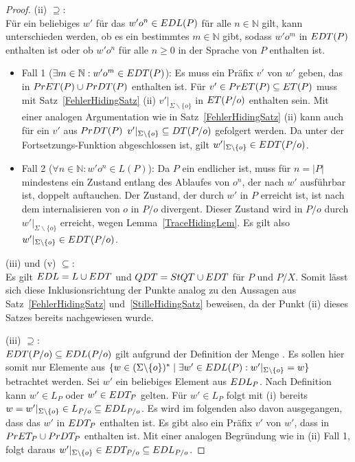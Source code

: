 \begin{proof}
  (ii)  \glqq $\supseteq$\grqq{}:\\
  Für ein beliebiges $w'$ für das $w'o^n\in EDL (P)$ für alle $n\in\mathbb{N}$
  gilt, kann unterschieden werden, ob es ein bestimmtes $m\in\mathbb{N}$ gibt,
  sodass $w'o^m$ in $EDT (P)$ enthalten ist oder ob $w'o^n$ für alle $n\geq 0$
  in der Sprache von $P$ enthalten ist.
  \begin{itemize}
    \item Fall 1 ($\exists m\in\mathbb{N}: w'o^m\in EDT (P)$): Es muss ein
      Präfix $v'$ von $w'$ geben, das in $PrET (P)\cup PrDT (P)$ enthalten
      ist. Für $v'\in PrET (P) \subseteq ET (P)$ muss mit
      Satz~\ref{FehlerHidingSatz} (ii) $v'|_{\Sigma\backslash\{o\}}$ in $ET
      (P/o)$ enthalten sein. Mit einer analogen Argumentation wie in
      Satz~\ref{FehlerHidingSatz} (ii) kann auch für ein $v'$ aus $PrDT (P)$
      $v'|_{\Sigma\backslash\{o\}}\subseteq DT (P/o)$ gefolgert werden. Da
      \EDT{} unter der Fortsetzungs-Funktion \cont{} abgeschlossen ist, gilt
      $w'|_{\Sigma\backslash\{o\}}\in EDT (P/o)$.
    \item Fall 2 ($\forall n\in\mathbb{N}: w'o^n\in L (P)$): Da $P$ ein
      endlicher \MEIO{} ist, muss für $n = |P|$ mindestens ein Zustand entlang
      des Ablaufes von $o^n$, der nach $w'$ ausführbar ist, doppelt auftauchen.
      Der Zustand, der durch $w'$ in $P$ erreicht ist, ist nach dem
      internalisieren von $o$ in $P/o$ divergent. Dieser Zustand wird in $P/o$
      durch $w'|_{\Sigma\backslash\{o\}}$ erreicht, wegen
      Lemma~\ref{TraceHidingLem}. Es gilt also $w'|_{\Sigma\backslash\{o\}} \in
      EDT (P/o)$.
  \end{itemize}

  (iii) und (v) \glqq $\subseteq$\grqq{}:\\
  Es gilt $EDL = L \cup EDT$ und $QDT = StQT \cup EDT$ für $P$ und $P/X$.
  Somit lässt sich diese Inklusionsrichtung der Punkte analog zu den Aussagen
  aus Satz~\ref{FehlerHidingSatz} und~\ref{StilleHidingSatz} beweisen, da der
  Punkt (ii) dieses Satzes bereits nachgewiesen wurde.

  (iii) \glqq $\supseteq$\grqq{}:\\
  $EDT (P/o)\subseteq EDL (P/o)$ gilt aufgrund der Definition der Menge
  \EDL{}. Es sollen hier somit nur Elemente aus $\{w\in (\Sigma\backslash
  \{o\})^*\mid \exists w'\in EDL(P): w'|_{\Sigma\backslash \{o\}} = w\}$
  betrachtet werden. Sei $w'$ ein beliebiges Element aus $EDL _P$. Nach
  Definition kann $w'\in L_P$ oder $w'\in EDT _P$ gelten. Für $w'\in L_P$ folgt
  mit (i) bereits $w = w'|_{\Sigma\backslash \{o\}}\in L_{P/o}\subseteq EDL
  _{P/o}$. Es wird im folgenden also davon ausgegangen, dass das $w'$ in $EDT
  _P$ enthalten ist. Es gibt also ein Präfix $v'$ von $w'$, dass in $PrET_P
  \cup PrDT _P$ enthalten ist. Mit einer analogen Begründung wie in (ii) Fall
  1, folgt daraus $w'|_{\Sigma\backslash\{o\}} \in EDT _{P/o} \subseteq EDL
  _{P/o}$.


\end{proof}
